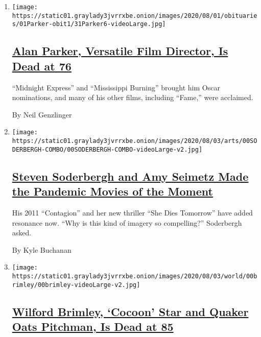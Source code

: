 \begin{enumerate}
\def\labelenumi{\arabic{enumi}.}
\item
  \texttt{[image: https://static01.graylady3jvrrxbe.onion/images/2020/08/01/obituaries/01Parker-obit1/31Parker6-videoLarge.jpg]}

  \hypertarget{alan-parker-versatile-film-director-is-dead-at-76}{%
  \subsection{\texorpdfstring{\href{/2020/07/31/movies/alan-parker-versatile-film-director-is-dead-at-76.html}{Alan
  Parker, Versatile Film Director, Is Dead at
  76}}{Alan Parker, Versatile Film Director, Is Dead at 76}}\label{alan-parker-versatile-film-director-is-dead-at-76}}

  ``Midnight Express'' and ``Mississippi Burning'' brought him Oscar
  nominations, and many of his other films, including ``Fame,'' were
  acclaimed.

  By Neil Genzlinger
\item
  \texttt{[image: https://static01.graylady3jvrrxbe.onion/images/2020/08/03/arts/00SODERBERGH-COMBO/00SODERBERGH-COMBO-videoLarge-v2.jpg]}

  \hypertarget{steven-soderbergh-and-amy-seimetz-made-the-pandemic-movies-of-the-moment}{%
  \subsection{\texorpdfstring{\href{/2020/07/31/movies/steven-soderbergh-amy-seimetz-pandemic.html}{Steven
  Soderbergh and Amy Seimetz Made the Pandemic Movies of the
  Moment}}{Steven Soderbergh and Amy Seimetz Made the Pandemic Movies of the Moment}}\label{steven-soderbergh-and-amy-seimetz-made-the-pandemic-movies-of-the-moment}}

  His 2011 ``Contagion'' and her new thriller ``She Dies Tomorrow'' have
  added resonance now. ``Why is this kind of imagery so compelling?''
  Soderbergh asked.

  By Kyle Buchanan
\item
  \texttt{[image: https://static01.graylady3jvrrxbe.onion/images/2020/08/03/world/00brimley/00brimley-videoLarge-v2.jpg]}

  \hypertarget{wilford-brimley-cocoon-star-and-quaker-oats-pitchman-is-dead-at-85}{%
  \subsection{\texorpdfstring{\href{/2020/08/01/obituaries/wilford-brimley-dead.html}{Wilford
  Brimley, `Cocoon' Star and Quaker Oats Pitchman, Is Dead at
  85}}{Wilford Brimley, `Cocoon' Star and Quaker Oats Pitchman, Is Dead at 85}}\label{wilford-brimley-cocoon-star-and-quaker-oats-pitchman-is-dead-at-85}}


\end{enumerate}
